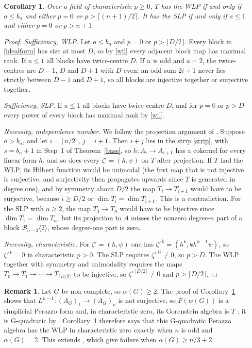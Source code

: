 \documentclass[11pt,a4paper]{article}
\newtheorem{corollary}[theorem]{Corollary}
\theoremstyle{definition}
\newtheorem{remark}[theorem]{Remark}
\newcommand{\B}{\mathcal B}
\begin{document}
\begin{corollary}\label{tg}
Over a field of characteristic $p\ge0$, $T$ has the WLP if and only if $a\le b_n$ and either $p=0$ or $p>\lceil(n+1)/2\rceil$. It has the SLP if and only if $a\le1$ and either $p=0$ or $p>n+1$.
\end{corollary}
\begin{proof}
\emph{Sufficiency, WLP.} Let $a\le b_n$ and $p=0$ or $p>\lceil D/2\rceil$. Every block in \eqref{idealform} has size at most $D$, so by \eqref{wil} every adjacent block map has maximal rank. If $a\le1$ all blocks have twice-centre $D$. If $n$ is odd and $a=2$, the twice-centres are $D-1$, $D$ and $D+1$ with $D$ even; an odd sum $2i+1$ never lies strictly between $D-1$ and $D+1$, so all blocks are injective together or surjective together.

\emph{Sufficiency, SLP.} If $a\le1$ all blocks have twice-centre $D$, and for $p=0$ or $p>D$ every power of every block has maximal rank by \eqref{wil}.

\emph{Necessity, independence number.} We follow the projection argument of \cite[Theorem~4.6]{HN}. Suppose $a>b_n$, and let $i=\lceil n/2\rceil$, $j=i+1$. Then $i+j$ lies in the strip \eqref{strip}, with $s=b_n+1$ in Step~1 of Theorem~\ref{base}, so $h:A_i\to A_{i+1}$ has a cokernel for every linear form $h$, and so does every $\zeta'=(h,\psi)$ on $T$ after projection. If $T$ had the WLP, its Hilbert function would be unimodal (the first map that is not injective is surjective, and surjectivity then propagates upwards since $T$ is generated in degree one), and by symmetry about $D/2$ the map $T_i\to T_{i+1}$ would have to be surjective, because $i\ge D/2$ or $\dim T_i=\dim T_{i+1}$. This is a contradiction. For the SLP with $a\ge2$, the map $T_1\to T_n$ would have to be bijective since $\dim T_1=\dim T_n$, but its projection to $A$ misses the nonzero degree-$n$ part of a block $\B_{n-2}\langle2\rangle$, whose degree-one part is zero.

\emph{Necessity, characteristic.} For $\zeta'=(h,\psi)$ one has $\zeta'^{\,k}=(h^k,kh^{k-1}\psi)$, so $\zeta'^{\,p}=0$ in characteristic $p>0$. The SLP requires $\zeta'^{\,D}\ne0$, so $p>D$. The WLP together with symmetry and unimodality requires the maps $T_0\to T_1\to\cdots\to T_{\lceil D/2\rceil}$ to be injective, so $\zeta'^{\,\lceil D/2\rceil}\ne0$ and $p>\lceil D/2\rceil$.
\end{proof}

\begin{remark}
Let $G$ be non-complete, so $\alpha(G)\ge2$. The proof of Corollary~\ref{tg} shows that $L^{n-1}:(A_G)_1\to(A_G)_n$ is not surjective, so $F(w(G))$ is a simplicial Perazzo form \cite[Lemma~4.3]{HN} and, in characteristic zero, its Gorenstein algebra is $T$ \cite[Lemma~4.5]{HN}; it is G-quadratic by \cite[Theorem~4.4]{HN}. Corollary~\ref{tg} therefore says that this G-quadratic Perazzo algebra has the WLP in characteristic zero exactly when $n$ is odd and $\alpha(G)=2$. This extends \cite[Theorem~4.6 and Corollary~4.7]{HN}, which give failure when $\alpha(G)\ge n/3+2$.
\end{remark}
\end{document}
